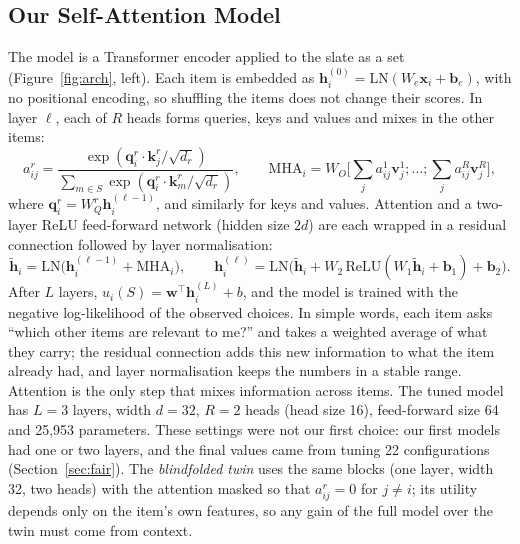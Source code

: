 \documentclass[11pt,a4paper]{article}
\numberwithin{table}{section}
\numberwithin{figure}{section}
\numberwithin{equation}{section}
\begin{document}
\subsection{Our Self-Attention Model}\label{sec:sa}
The model is a Transformer encoder applied to the slate as a set (Figure~\ref{fig:arch}, left). Each item is embedded as $\mathbf h_i^{(0)}=\mathrm{LN}(W_e\mathbf x_i+\mathbf b_e)$, with no positional encoding, so shuffling the items does not change their scores. In layer $\ell$, each of $R$ heads forms queries, keys and values and mixes in the other items:
\begin{equation}
a^r_{ij}=\frac{\exp(\mathbf q^r_i\cdot\mathbf k^r_j/\sqrt{d_r})}{\sum_{m\in S}\exp(\mathbf q^r_i\cdot\mathbf k^r_m/\sqrt{d_r})},\qquad
\mathrm{MHA}_i=W_O\big[\textstyle\sum_j a^1_{ij}\mathbf v^1_j;\dots;\sum_j a^R_{ij}\mathbf v^R_j\big],
\end{equation}
where $\mathbf q^r_i=W^r_Q\mathbf h^{(\ell-1)}_i$, and similarly for keys and values. Attention and a two-layer ReLU feed-forward network (hidden size $2d$) are each wrapped in a residual connection followed by layer normalisation:
\begin{equation}
\tilde{\mathbf h}_i=\mathrm{LN}\big(\mathbf h^{(\ell-1)}_i+\mathrm{MHA}_i\big),\qquad
\mathbf h^{(\ell)}_i=\mathrm{LN}\big(\tilde{\mathbf h}_i+W_2\,\mathrm{ReLU}(W_1\tilde{\mathbf h}_i+\mathbf b_1)+\mathbf b_2\big).
\end{equation}
After $L$ layers, $u_i(S)=\mathbf w^{\top}\mathbf h^{(L)}_i+b$, and the model is trained with the negative log-likelihood of the observed choices. In simple words, each item asks ``which other items are relevant to me?'' and takes a weighted average of what they carry; the residual connection adds this new information to what the item already had, and layer normalisation keeps the numbers in a stable range. Attention is the only step that mixes information across items. The tuned model has $L=3$ layers, width $d=32$, $R=2$ heads (head size 16), feed-forward size 64 and 25,953 parameters. These settings were not our first choice: our first models had one or two layers, and the final values came from tuning 22 configurations (Section~\ref{sec:fair}). The \emph{blindfolded twin} uses the same blocks (one layer, width 32, two heads) with the attention masked so that $a^r_{ij}=0$ for $j\ne i$; its utility depends only on the item's own features, so any gain of the full model over the twin must come from context.
\end{document}
